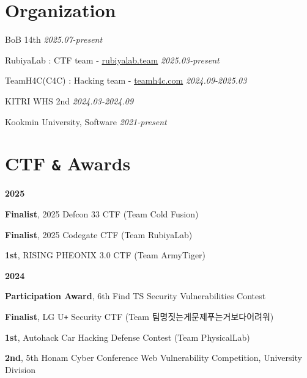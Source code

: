 \documentclass[margin,line]{resume}
\begin{document}
\begin{resume}
 	

 	    \section{\mysidestyle Organization}%
 	      \begin{list2}
            \item{BoB 14th \hfill \textsl{2025.07-present}}
 	          \item{RubiyaLab : CTF team - \href{https://rubiyalab.team}{rubiyalab.team} \hfill \textsl{2025.03-present}}
            \item{TeamH4C(C4C) : Hacking team - \href{https://teamh4c.com}{teamh4c.com} \hfill \textsl{2024.09-2025.03}}
 	          \item{KITRI WHS 2nd  \hfill \textsl{2024.03-2024.09}}
 	          \item{Kookmin University, Software  \hfill \textsl{2021-present}}
 	      
 	      \end{list2}


        \section{\mysidestyle CTF \texttt{\&} Awards}
      
        \textbf{2025}
        \vspace{1mm}
        \begin{list2}
          \item \textbf{Finalist}, 2025 Defcon 33 CTF (Team Cold Fusion)
          \item \textbf{Finalist}, 2025 Codegate CTF (Team RubiyaLab)
          \item \textbf{1st}, RISING PHEONIX 3.0 CTF (Team ArmyTiger)
        \end{list2}
        
        \textbf{2024}
        \vspace{1mm}
        \begin{list2}
          \item \textbf{Participation Award}, 6th Find TS Security Vulnerabilities Contest
          \item \textbf{Finalist}, LG U\texttt{+} Security CTF (Team 팀명짓는게문제푸는거보다어려워)
          \item \textbf{1st}, Autohack Car Hacking Defense Contest (Team PhysicalLab)
          \item \textbf{2nd}, 5th Honam Cyber Conference Web Vulnerability Competition, University Division
        \end{list2}


\end{resume}
\end{document}
